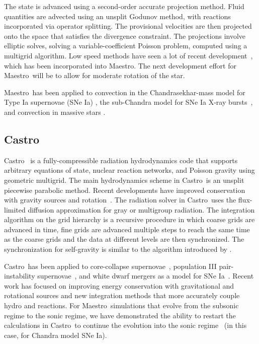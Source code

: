 \documentclass[letterpaper]{jpconf}
\newcommand{\maestro}{{\sffamily Maestro}}
\newcommand{\castro}{{\sffamily Castro}}
\begin{document}
The state is advanced using a second-order accurate projection method.
Fluid quantities are advected using an unsplit Godunov method, with
reactions incorporated via operator splitting.  The provisional
velocities are then projected onto the space that satisfies the
divergence constraint.  The projections involve elliptic solves,
solving a variable-coefficient Poisson problem, computed using a
multigrid algorithm.  Low speed methods have seen a lot of recent
development~\cite{kleinpauluis,vasil:2013}, which has been
incorporated into \maestro.  The next development effort for
\maestro\ will be to allow for moderate rotation of the star.

\maestro\ has been applied to convection in the Chandrasekhar-mass
model for Type Ia supernovae (SNe Ia)
\cite{ZABNW:IV,wdconvect,wdturb}, the sub-Chandra model for SNe Ia
\cite{subchandra,subchandra2} X-ray bursts~\cite{xrb,xrb2,xrb3}, and
convection in massive stars \cite{ms_cc}.





\subsection{\castro}

\castro~\cite{castro,castroII,castroIII} is a fully-compressible
radiation hydrodynamics code that supports arbitrary equations of
state, nuclear reaction networks, and Poisson gravity using geometric
multigrid.  The main hydrodynamics scheme in \castro\ is an unsplit
piecewise parabolic method.  Recent developments have improved
conservation with gravity sources and rotation~\cite{wdmergerI}.  The
radiation solver in \castro\ uses the flux-limited diffusion
approximation for gray or multigroup radiation.  The integration
algorithm on the grid hierarchy is a recursive procedure in which
coarse grids are advanced in time, fine grids are advanced multiple
steps to reach the same time as the coarse grids and the data at
different levels are then synchronized. The synchronization for
self-gravity is similar to the algorithm introduced by
\cite{miniati-colella}.

\castro\ has been applied to core-collapse
supernovae~\cite{castro-ccsne}, population III pair-instability
supernovae~\cite{castro-pairinstability}, and white dwarf mergers as a
model for SNe Ia~\cite{wdmergerI}.  Recent work has focused on
improving energy conservation with gravitational and rotational
sources and new integration methods that more accurately couple hydro
and reactions.  For \maestro\ simulations that evolve from the
subsonic regime to the sonic regime, we have demonstrated the ability
to restart the calculations in \castro\ to continue the evolution into
the sonic regime~\cite{scidac-petascale,malone:2014} (in this case,
for Chandra model SNe Ia).
\end{document}
